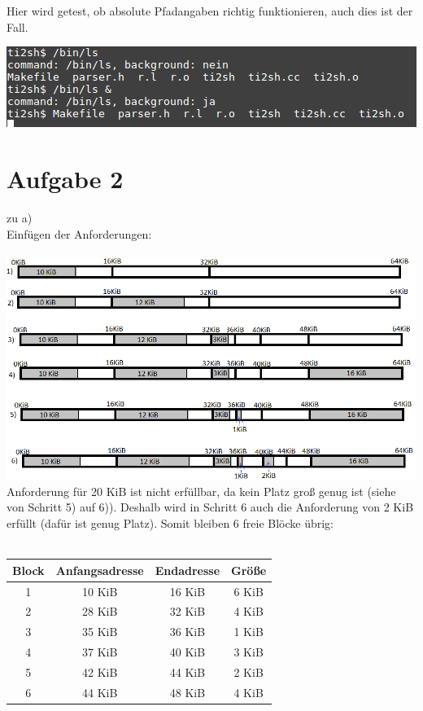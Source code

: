 \documentclass{ti2}
\begin{document}
Hier wird getest, ob absolute Pfadangaben richtig funktionieren, auch dies ist der Fall.\\
\begin{minipage}{\linewidth}
	\centering%
	\includegraphics[width=\textwidth]{aufgabe01/test5.png}
\end{minipage}


\section*{Aufgabe 2}
zu a)\\
Einfügen der Anforderungen: \\\\
\includegraphics[width=1.05\textwidth]{Aufgabe2.png}
Anforderung für 20 KiB ist nicht erfüllbar, da kein Platz groß genug ist (siehe von Schritt 5) auf 6)). Deshalb wird in Schritt 6 auch die Anforderung von 2 KiB erfüllt (dafür ist genug Platz). Somit bleiben 6 freie Blöcke übrig: \\\\
\begin{tabular}[c]{|c|c|c|c|}
	\hline
	Block & Anfangsadresse & Endadresse & Größe \\
	\hline
	\hline
	1 & 10 KiB & 16 KiB & 6 KiB \\
	\hline
	2 & 28 KiB & 32 KiB & 4 KiB \\
	\hline
	3 & 35 KiB & 36 KiB & 1 KiB \\
	\hline
	4 & 37 KiB & 40 KiB & 3 KiB \\
	\hline
	5 & 42 KiB & 44 KiB & 2 KiB \\
	\hline
	6 & 44 KiB & 48 KiB & 4 KiB \\
	\hline
\end{tabular}\\\\
\end{document}
